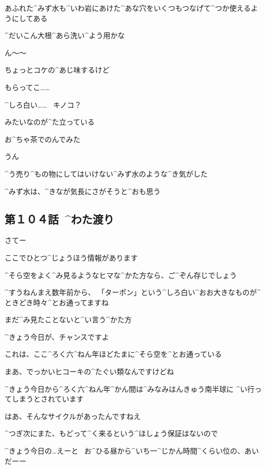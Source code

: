 \page
\Alpha あふれた^{みず}{水}も^{いわ}{岩}にあけた^{あな}{穴}をいくつもつなげて^{つか}{使}えるようにしてある

\Alpha ^{だいこん}{大根}^{あら}{洗}い^{よう}{用}かな

\page
\Alpha ん〜〜

\Alpha ちょっとコケの^{あじ}{味}するけど

\Alpha もらってこ……

\page[53]
\Alpha ^{しろ}{白}い……
\ キノコ？

\Alpha みたいなのが^{た}{立}っている

\page[55]
\Alpha お^{ちゃ}{茶}でのんでみた

\Alpha うん

\page
\Alpha ^{う}{売}り^{もの}{物}にしてはいけない^{みず}{水}のような^{き}{気}がした

\Alpha ^{みず}{水}は、^{きなが}{気長}にさがそうと^{おも}{思}う


\subsection{第１０４話\ ^{わた}{渡}り}

\page[59]
\Person さてー

\Person ここでひとつ^{じょうほう}{情報}があります

\page
\Person ^{そら}{空}をよく^{み}{見}るようなヒマな^{かた}{方}なら、ご^{ぞん}{存}じでしょう

\Person ^{すうねんまえ}{数年前}から、
「ターポン」という^{しろ}{白}い^{おお}{大}きなものが^{ときどき}{時々}^{とお}{通}ってますね

\Person まだ^{み}{見}たことないと^{い}{言}う^{かた}{方}

\Person ^{きょう}{今日}が、チャンスですよ

\Person これは、ここ^{ろく}{六}^{ねん}{年}ほどたまに^{そら}{空}を^{とお}{通}っている

\Person まあ、でっかいヒコーキの^{たぐい}{類}なんですけどね

\page
\Person ^{きょう}{今日}から^{ろく}{六}^{ねん}{年}^{かん}{間}は^{みなみはんきゅう}{南半球}に
^{い}{行}ってしまうとされています

\Person はあ、そんなサイクルがあったんですねえ

\Person ^{つぎ}{次}にまた、もどって^{く}{来}るという^{ほしょう}{保証}はないので

\Person ^{きょう}{今日}の…えーと
\ お^{ひる}{昼}から^{いち}{一}^{じかん}{時間}^{くらい}{位}の、あいだーー

